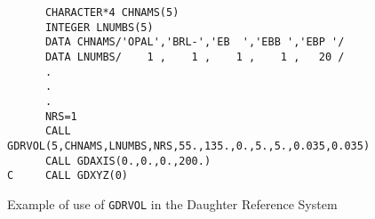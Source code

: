 \begin{figure}[hbt]
     \centering

\begin{verbatim}
      CHARACTER*4 CHNAMS(5)
      INTEGER LNUMBS(5)
      DATA CHNAMS/'OPAL','BRL-','EB  ','EBB ','EBP '/
      DATA LNUMBS/    1 ,    1 ,    1 ,    1 ,   20 /
      .
      .
      .
      NRS=1
      CALL GDRVOL(5,CHNAMS,LNUMBS,NRS,55.,135.,0.,5.,5.,0.035,0.035)
      CALL GDAXIS(0.,0.,0.,200.)
C     CALL GDXYZ(0)
\end{verbatim}

\caption{Example of use of {\tt GDRVOL} in the Daughter Reference System}
\label{fg:draw115-2}
\end{figure}
 
